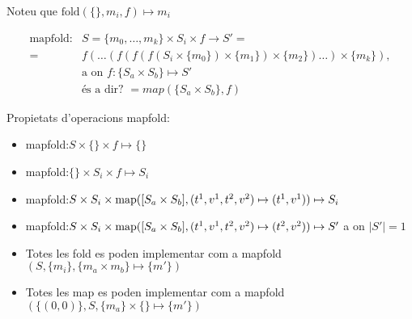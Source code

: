 Noteu que $\text{fold}(\{\},m_i,f) \mapsto m_i$ 







\begin{align*}
  \text{mapfold}: & S=\{m_0,\dotsc,m_k\} \times S_i \times f \longrightarrow S'= \\
                 =& f(\dots(f(f(f(S_i\times\{m_0\})\times\{m_1\})\times\{m_2\})\dots)\times\{m_k\}), \\
                  & \text{a on } f: \{S_a \times S_b \}\mapsto S'\\
                  & \text{és a dir? } =map( \{S_a \times S_b \},f)
\end{align*}



Propietats d'operacions mapfold:
\begin{itemize}
\item mapfold:$S \times \{\} \times f \mapsto \{\}$ 

\item mapfold:$\{\} \times S_i \times f \mapsto S_i$ 

\item mapfold:$S \times S_i \times
  \operatorname*{map}([S_a\times S_b],(t^1,v^1,t^2,v^2)\mapsto(t^1,v^1)) \mapsto S_i$

\item mapfold:$S \times S_i \times \operatorname*{map}([S_a\times
  S_b],(t^1,v^1,t^2,v^2)\mapsto(t^2,v^2)) \mapsto S'$ a on $|S'|=1$

\item Totes les fold es poden implementar com a mapfold$(S,\{m_i\},
  \{m_a \times m_b\} \mapsto \{m'\})$

\item Totes les map es poden implementar com a mapfold$(\{(0,0)\},S,
  \{m_a\} \times  \{\} \mapsto \{m'\})$
\end{itemize}



